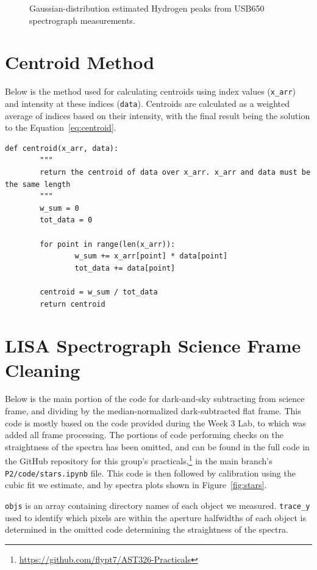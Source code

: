 \documentclass[twocolumn]{aastex702}
\begin{document}
	 		\begin{figure}[h]
				\caption{Gaussian-distribution estimated Hydrogen peaks from USB650 spectrograph measurements.}
				\label{fig:H-peaks}
			\end{figure}
 	
  	\section{Centroid Method}\label{code:centroid}
  	
  		Below is the method used for calculating centroids using index values (\texttt{x\_arr}) and intensity at these indices (\texttt{data}). Centroids are calculated as a weighted average of indices based on their intensity, with the final result being the solution to the Equation~\ref{eq:centroid}.
 
  		\begin{verbatim}
def centroid(x_arr, data):
		"""
		return the centroid of data over x_arr. x_arr and data must be the same length
		"""
		w_sum = 0
		tot_data = 0
	    
		for point in range(len(x_arr)):
				w_sum += x_arr[point] * data[point]
				tot_data += data[point]
	    
		centroid = w_sum / tot_data
		return centroid
  		\end{verbatim}
  		
	\section{LISA Spectrograph Science Frame Cleaning}\label{code:LISA}
		
		Below is the main portion of the code for dark-and-sky subtracting from science frame, and dividing by the median-normalized dark-subtracted flat frame. This code is mostly based on the code provided during the Week 3 Lab, to which was added all frame processing. The portions of code performing checks on the straightness of the spectra has been omitted, and can be found in the full code in the GitHub repository for this group's practicals,\footnote{\href{https://github.com/flypt7/AST326-Practicals}{https://github.com/flypt7/AST326-Practicals}} in the main branch's \texttt{P2/code/stars.ipynb} file. This code is then followed by calibration using the cubic fit we estimate, and by spectra plots shown in Figure~\ref{fig:stars}.
		
		\texttt{objs} is an array containing directory names of each object we measured. \texttt{trace\_y} used to identify which pixels are within the aperture halfwidths of each object is determined in the omitted code determining the straightness of the spectra.
		
\end{document}

